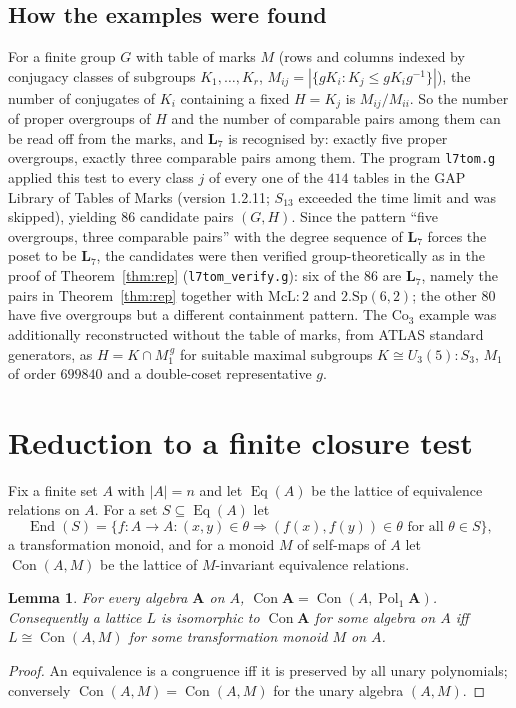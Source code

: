 \documentclass[11pt]{article}
\newtheorem{lemma}[theorem]{Lemma}
\theoremstyle{remark}
\newcommand{\Con}{\operatorname{Con}}
\newcommand{\Eq}{\operatorname{Eq}}
\newcommand{\End}{\operatorname{End}}
\newcommand{\LL}{\mathbf{L}_7}
\begin{document}
\subsection*{How the examples were found}
For a finite group $G$ with table of marks $M$ (rows and columns indexed by conjugacy classes
of subgroups $K_1,\dots,K_r$, $M_{ij}=|\{gK_i : K_j\le gK_ig^{-1}\}|$), the number of conjugates
of $K_i$ containing a fixed $H=K_j$ is $M_{ij}/M_{ii}$. So the number of proper overgroups of
$H$ and the number of comparable pairs among them can be read off from the marks, and $\LL$ is
recognised by: exactly five proper overgroups, exactly three comparable pairs among them. The
program \texttt{l7tom.g} applied this test to every class $j$ of every one of the $414$ tables in
the GAP Library of Tables of Marks \cite{TomLib} (version 1.2.11; $S_{13}$ exceeded the time
limit and was skipped), yielding $86$ candidate pairs $(G,H)$. Since the pattern
``five overgroups, three comparable pairs'' with the degree sequence of $\LL$ forces the poset to
be $\LL$, the candidates were then verified group-theoretically as in the proof of
Theorem~\ref{thm:rep} (\texttt{l7tom\_verify.g}): six of the $86$ are $\LL$, namely the pairs in
Theorem~\ref{thm:rep} together with $\mathrm{McL}{:}2$ and $2.\mathrm{Sp}(6,2)$; the other $80$
have five overgroups but a different containment pattern. The $\mathrm{Co}_3$ example was
additionally reconstructed without the table of marks, from ATLAS standard generators, as
$H=K\cap M_1^{\,g}$ for suitable maximal subgroups $K\cong U_3(5){:}S_3$, $M_1$ of order
$699840$ and a double-coset representative $g$.

\section{Reduction to a finite closure test}

Fix a finite set $A$ with $|A|=n$ and let $\Eq(A)$ be the lattice of equivalence relations on $A$.
For a set $S\subseteq\Eq(A)$ let
\[
\End(S)=\{f\colon A\to A : (x,y)\in\theta\Rightarrow (f(x),f(y))\in\theta \text{ for all }\theta\in S\},
\]
a transformation monoid, and for a monoid $M$ of self-maps of $A$ let
$\Con(A,M)$ be the lattice of $M$-invariant equivalence relations.

\begin{lemma}\label{lem:unary}
For every algebra $\mathbf A$ on $A$, $\Con\mathbf A=\Con(A,\operatorname{Pol}_1\mathbf A)$.
Consequently a lattice $L$ is isomorphic to $\Con\mathbf A$ for some algebra on $A$ iff
$L\cong\Con(A,M)$ for some transformation monoid $M$ on $A$.
\end{lemma}
\begin{proof}
An equivalence is a congruence iff it is preserved by all unary polynomials; conversely
$\Con(A,M)=\Con(A,M)$ for the unary algebra $(A,M)$.
\end{proof}
\end{document}
